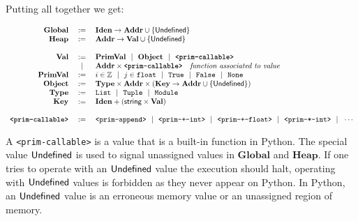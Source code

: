 Putting all together we get:

\vspace*{-1em}
\[\begin{array}{rcl}
  \mathbf{Global}  &:=& \mathbf{Iden} \to \mathbf{Addr} \cup \{\mathsf{Undefined}\} \\
  \mathbf{Heap}  &:=& \mathbf{Addr} \to \mathbf{Val} \cup \{\mathsf{Undefined}\} \\
  \\
  \mathbf{Val} &:=& \mathbf{PrimVal} ~~|~~ \mathbf{Object} ~~|~~ \textbf{\texttt{<prim-callable>}} \\
         &~~|~~& \mathbf{Addr} \times \textbf{\texttt{<prim-callable>}} \quad \textit{function associated to value} \\
  \mathbf{PrimVal} &:=& i \in \mathbb{Z} ~~|~~ j \in \texttt{float} ~~|~~ \texttt{True} ~~|~~ \texttt{False} ~~|~~ \texttt{None} \\
  \mathbf{Object} &:=& \mathbf{Type} \times \mathbf{Addr} \times \left(\mathbf{Key} \to \mathbf{Addr} \cup \{\mathsf{Undefined}\}\right) \\
  \mathbf{Type} &:=& \texttt{List} ~~|~~ \texttt{Tuple} ~~|~~ \texttt{Module} \\
  \mathbf{Key} &:=& \mathbf{Iden} + \left(\textsf{string} \times \mathbf{Val}\right) \\
  \\
  \textbf{\texttt{<prim-callable>}} &:=& \texttt{<prim-append>} ~~|~~ \texttt{<prim-+-int>}
     ~~|~~\texttt{<prim-+-float>} ~~|~~ \texttt{<prim-*-int>} ~~|~~ \cdots \\
\end{array}\]

%
%
%

A \texttt{<prim-callable>} is a value that is a built-in function in Python. The special
value \(\mathsf{Undefined}\) is used to signal unassigned values in \(\mathbf{Global}\) and
\(\mathbf{Heap}\). If one tries to operate with an \(\mathsf{Undefined}\) value the execution should
halt, operating with \(\mathsf{Undefined}\) values is forbidden as they never appear on Python. In
Python, an \(\mathsf{Undefined}\) value is an erroneous memory value or an unassigned region of
memory.

